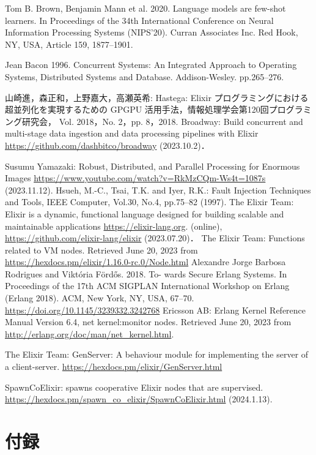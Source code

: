 \documentclass[a4paper]{jreport}	%
\begin{document}
%
%

\begin{thebibliography}{99}

Tom B. Brown, Benjamin Mann et al. 2020. Language models are few-shot learners. In Proceedings of the 34th International Conference on Neural Information Processing Systems (NIPS'20). Curran Associates Inc. Red Hook, NY, USA, Article 159, 1877--1901.

Jean Bacon 1996. Concurrent Systems: An Integrated Approach to Operating Systems, Distributed Systems and Database. Addison-Wesley. pp.265--276.

山崎進，森正和，上野嘉大，高瀬英希: Hastega: Elixir プログラミングにおける超並列化を実現するための GPGPU 活用手法，情報処理学会第120回プログラミング研究会， Vol. 2018，No. 2，pp. 8，2018.
Broadway: Build concurrent and multi-stage data ingestion and data processing pipelines with Elixir \url{https://github.com/dashbitco/broadway} (2023.10.2)．

Susumu Yamazaki: Robust, Distributed, and Parallel Processing for Enormous Images \url{https://www.youtube.com/watch?v=RkMzCQm-Ws4t=1087s} (2023.11.12).
Hsueh, M.-C., Tsai, T.K. and Iyer, R.K.: Fault Injection Techniques and Tools, IEEE Computer, Vol.30, No.4, pp.75--82 (1997).
The Elixir Team: Elixir is a dynamic, functional language designed for building scalable and maintainable applications \url{https://elixir-lang.org}. (online), \url{https://github.com/elixir-lang/elixir} (2023.07.20)．
The Elixir Team: Functions related to VM nodes. Retrieved June 20, 2023 from \url{https://hexdocs.pm/elixir/1.16.0-rc.0/Node.html}
Alexandre Jorge Barbosa Rodrigues and Viktória Fördős. 2018. To- wards Secure Erlang Systems. In Proceedings of the 17th ACM SIGPLAN International Workshop on Erlang (Erlang 2018). ACM, New York, NY, USA, 67--70. \url{https://doi.org/10.1145/3239332.3242768}
Ericsson AB: Erlang Kernel Reference Manual Version 6.4, net kernel:monitor nodes. Retrieved June 20, 2023 from \url{http://erlang.org/doc/man/net_kernel.html}.

The Elixir Team: GenServer: A behaviour module for implementing the server of a client-server. \url{https://hexdocs.pm/elixir/GenServer.html}  

SpawnCoElixir: spawns cooperative Elixir nodes that are supervised. \url{https://hexdocs.pm/spawn_co_elixir/SpawnCoElixir.html} (2024.1.13).
\chapter*{付録}


\end{thebibliography}
\end{document}
